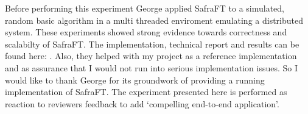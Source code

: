   
 
Before performing this experiment George applied SafraFT to a simulated, random basic algorithm in a multi threaded enviroment emulating a distributed system.
These experiments showed strong evidence towards correctness and scalabilty of SafraFT.
The implementation, technical report and results can be found here: \cite{georgework}.
Also, they helped with my project as a reference implementation and as assurance that I would not run into serious implementation issues.
So I would like to thank George for its groundwork of providing a running implementation of SafraFT.
The experiment presented here is performed as reaction to reviewers feedback to add `compelling end-to-end application'.
  

  